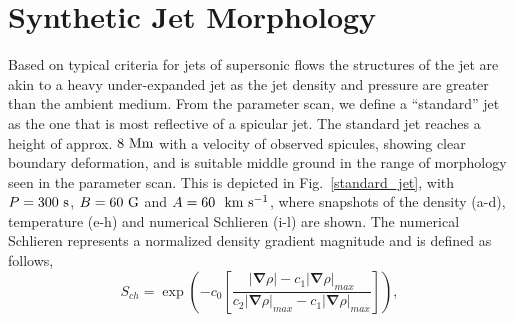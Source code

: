 \section{Synthetic Jet Morphology}
Based on typical criteria for jets of supersonic flows the structures of the jet are akin to a heavy under-expanded jet \citep{Norman1982, Edgington-Mitchell2014} as the jet density and pressure are greater than the ambient medium. From the parameter scan, we define a ``standard'' jet as the one that is most reflective of a spicular jet. The standard jet reaches a height of approx. $8~\rm{Mm}$ with a velocity of observed spicules, showing clear boundary deformation, and is suitable middle ground in the range of morphology seen in the parameter scan. This is depicted in Fig.~\ref{standard_jet}, with $P=300~\rm{s}$, $B=60~\rm{G}$ and $A=60~~\rm{km ~s^{-1}}$, where snapshots of the density (a-d), temperature (e-h) and numerical Schlieren (i-l) are shown. \np
%
The numerical Schlieren represents a normalized density gradient magnitude and is defined as follows,
\begin{equation}
   S_{ch} = \exp{\left( -c_0 \left[ \frac{|\boldsymbol{\nabla} \rho|-c_1 |\boldsymbol{\nabla} \rho|_{max}}{c_2 |\boldsymbol{\nabla} \rho|_{max}-c_1|\boldsymbol{\nabla} \rho|_{max}} \right] \right)},
\end{equation}
